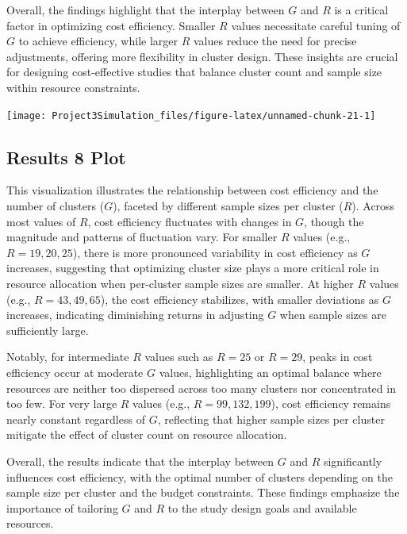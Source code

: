 \documentclass[
]{article}
\begin{document}
Overall, the findings highlight that the interplay between \(G\) and
\(R\) is a critical factor in optimizing cost efficiency. Smaller \(R\)
values necessitate careful tuning of \(G\) to achieve efficiency, while
larger \(R\) values reduce the need for precise adjustments, offering
more flexibility in cluster design. These insights are crucial for
designing cost-effective studies that balance cluster count and sample
size within resource constraints.

\begin{center}\texttt{[image: Project3Simulation\_files/figure-latex/unnamed-chunk-21-1]} \end{center}

\hypertarget{results-8-plot}{%
\subsection{Results 8 Plot}\label{results-8-plot}}

This visualization illustrates the relationship between cost efficiency
and the number of clusters (\(G\)), faceted by different sample sizes
per cluster (\(R\)). Across most values of \(R\), cost efficiency
fluctuates with changes in \(G\), though the magnitude and patterns of
fluctuation vary. For smaller \(R\) values (e.g., \(R = 19, 20, 25\)),
there is more pronounced variability in cost efficiency as \(G\)
increases, suggesting that optimizing cluster size plays a more critical
role in resource allocation when per-cluster sample sizes are smaller.
At higher \(R\) values (e.g., \(R = 43, 49, 65\)), the cost efficiency
stabilizes, with smaller deviations as \(G\) increases, indicating
diminishing returns in adjusting \(G\) when sample sizes are
sufficiently large.

Notably, for intermediate \(R\) values such as \(R = 25\) or \(R = 29\),
peaks in cost efficiency occur at moderate \(G\) values, highlighting an
optimal balance where resources are neither too dispersed across too
many clusters nor concentrated in too few. For very large \(R\) values
(e.g., \(R = 99, 132, 199\)), cost efficiency remains nearly constant
regardless of \(G\), reflecting that higher sample sizes per cluster
mitigate the effect of cluster count on resource allocation.

Overall, the results indicate that the interplay between \(G\) and \(R\)
significantly influences cost efficiency, with the optimal number of
clusters depending on the sample size per cluster and the budget
constraints. These findings emphasize the importance of tailoring \(G\)
and \(R\) to the study design goals and available resources.
\end{document}
